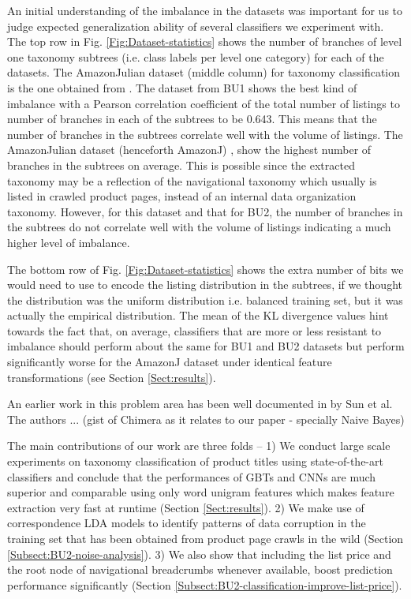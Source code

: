 An initial understanding of the imbalance in the datasets was important for us to judge expected generalization ability of several classifiers we experiment with. 
The top row in Fig. \ref{Fig:Dataset-statistics} shows the number of branches of level one taxonomy subtrees (i.e. class labels per level one category) for each of the datasets.
The AmazonJulian dataset (middle column) for taxonomy classification is the one obtained from \cite{Julian15}.
The dataset from BU1 shows the best kind of imbalance with a Pearson correlation coefficient of the total number of listings to number of branches in each of the subtrees to be 0.643.
This means that the number of branches in the subtrees correlate well with the volume of listings.
The AmazonJulian dataset (henceforth AmazonJ) \cite{Julian15}, show the highest number of branches in the subtrees on average.
This is possible since the extracted taxonomy may be a reflection of the navigational taxonomy which usually is listed in crawled product pages, instead of an internal data organization taxonomy.
However, for this dataset and that for BU2, the number of branches in the subtrees do not correlate well with the volume of listings indicating a much higher level of imbalance.

The bottom row of Fig. \ref{Fig:Dataset-statistics} shows the extra number of bits we would need to use to encode the listing distribution in the subtrees, if we thought the distribution was the uniform distribution i.e. balanced training set, but it was actually the empirical distribution.
The mean of the KL divergence values hint towards the fact that, on average, classifiers that are more or less resistant to imbalance should perform about the same for BU1 and BU2 datasets but perform significantly worse for the AmazonJ dataset under identical feature transformations (see Section \ref{Sect:results}).

An earlier work in this problem area has been well documented in \cite{Sun14} by Sun et al. 
The authors ... (gist of Chimera as it relates to our paper - specially Naive Bayes)

The main contributions of our work are three folds -- 
1) We conduct large scale experiments on taxonomy classification of product titles using state-of-the-art classifiers and conclude that the performances of GBTs and CNNs are much superior and comparable using only word unigram features which makes feature extraction very fast at runtime (Section \ref{Sect:results}). 
2) We make use of correspondence LDA models to identify patterns of data corruption in the training set that has been obtained from product page crawls in the wild (Section \ref{Subsect:BU2-noise-analysis}). 
3) We also show that including the list price and the root node of navigational breadcrumbs whenever available, boost prediction performance significantly (Section \ref{Subsect:BU2-classification-improve-list-price}).
